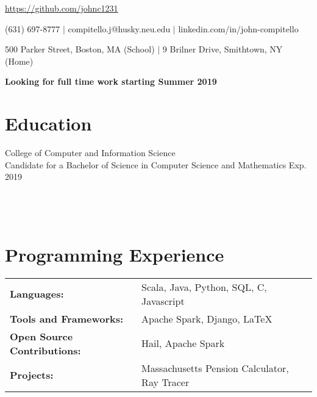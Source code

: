 \documentclass[12pt]{john_resume}
\begin{document}
\centerline{\url{https://github.com/johnc1231}}
\centerline{(631) 697-8777 $|$ compitello.j@husky.neu.edu $|$ linkedin.com/in/john-compitello}
\centerline{500 Parker Street, Boston, MA (School) $|$ 9 Brilner Drive, Smithtown, NY (Home)}
\centerline{\textbf{Looking for full time work starting Summer 2019}}

\section{Education}
College of Computer and Information Science\\
Candidate for a Bachelor of Science in Computer Science and Mathematics \hspace*{\fill} Exp. 2019 \\
 \\
\\
 \\

\section{Programming Experience}
\begin{tabular}{l l}
\textbf{Languages:} & Scala, Java, Python, SQL, C, Javascript\\
\textbf{Tools and Frameworks:} & Apache Spark, Django, LaTeX \\
\textbf{Open Source Contributions:} & Hail, Apache Spark \\
\textbf{Projects:} & Massachusetts Pension Calculator, Ray Tracer
\end{tabular}
\end{document}
